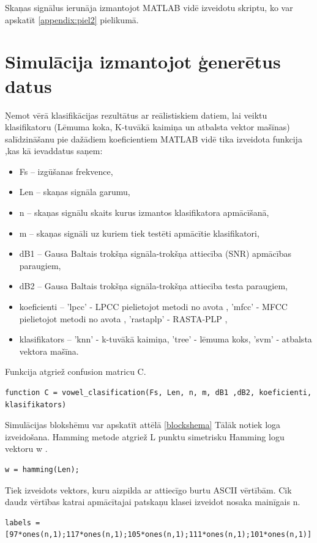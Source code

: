 \documentclass[12pt,paper=A4]{report}
\begin{document}
Skaņas signālus ierunāja izmantojot MATLAB vidē izveidotu skriptu, ko var apskatīt \ref{appendix:piel2} pielikumā.


\section{Simulācija izmantojot ģenerētus datus}

Ņemot vērā klasifikācijas rezultātus ar reālistiskiem datiem, lai veiktu klasifikatoru (Lēmuma koka, K-tuvākā kaimiņa un atbalsta vektor mašīnas) salīdzināšanu pie dažādiem koeficientiem MATLAB vidē tika izveidota funkcija ,kas kā ievaddatus saņem: 
\begin{itemize}
\item Fs – izgūšanas frekvence,
\item Len – skaņas signāla garumu,
\item n – skaņas signālu skaits kurus izmantos klasifikatora apmācīšanā, 
\item m – skaņas signāli uz kuriem tiek testēti apmācītie klasifikatori, 
\item dB1 – Gausa Baltais trokšņa signāla-trokšņa attiecība (SNR) apmācības paraugiem,
\item dB2 – Gausa Baltais trokšņa signāla-trokšņa attiecība testa paraugiem,
\item koeficienti – 
'lpcc' - LPCC pielietojot metodi no avota \cite{dtw39},                 
'mfcc' - MFCC pielietojot metodi no avota \cite{dtw39},              
'rastaplp' - RASTA-PLP \cite{dtw41},
\item klasifikators – 
'knn' - k-tuvākā kaimiņa\cite{dtw42},
'tree' - lēmuma koks\cite{dtw43},
'svm' - atbalsta vektora mašīna\cite{dtw44}.
\end{itemize}
Funkcija atgriež confusion matricu C.
\begin{lstlisting}
function C = vowel_clasification(Fs, Len, n, m, dB1 ,dB2, koeficienti, klasifikators)
\end{lstlisting}
Simulācijas blokshēmu var apskatīt attēlā \ref{blockshema}
Tālāk notiek loga izveidošana. Hamming metode atgriež L punktu simetrisku Hamming logu vektoru w \cite{dtw36}.
\begin{lstlisting}
w = hamming(Len);
\end{lstlisting}
Tiek izveidots vektors, kuru aizpilda ar attiecīgo burtu ASCII vērtībām. Cik daudz vērtības katrai apmācītajai patskaņu klasei izveidot nosaka mainīgais n.

\begin{lstlisting}
labels = [97*ones(n,1);117*ones(n,1);105*ones(n,1);111*ones(n,1);101*ones(n,1)]
\end{lstlisting}
\end{document}
